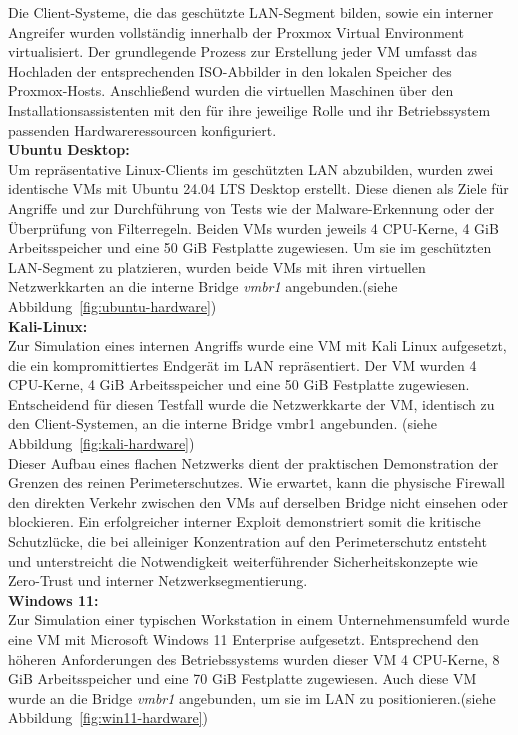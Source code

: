 Die Client-Systeme, die das geschützte LAN-Segment bilden, sowie ein interner Angreifer wurden vollständig innerhalb der Proxmox Virtual Environment virtualisiert. Der grundlegende Prozess zur Erstellung jeder VM umfasst das Hochladen der entsprechenden ISO-Abbilder in den lokalen Speicher des Proxmox-Hosts. Anschließend wurden die virtuellen Maschinen über den Installationsassistenten mit den für ihre jeweilige Rolle und ihr Betriebssystem passenden Hardwareressourcen konfiguriert.\\

\textbf{Ubuntu Desktop:}\\
Um repräsentative Linux-Clients im geschützten LAN abzubilden, wurden zwei identische VMs mit Ubuntu 24.04 LTS Desktop erstellt. Diese dienen als Ziele für Angriffe und zur Durchführung von Tests wie der Malware-Erkennung oder der Überprüfung von Filterregeln. Beiden VMs wurden jeweils 4 CPU-Kerne, 4 GiB Arbeitsspeicher und eine 50 GiB Festplatte zugewiesen. Um sie im geschützten LAN-Segment zu platzieren, wurden beide VMs mit ihren virtuellen Netzwerkkarten an die interne Bridge \textit{vmbr1} angebunden.(siehe Abbildung~\ref{fig:ubuntu-hardware})\\

\textbf{Kali-Linux:}\\
Zur Simulation eines internen Angriffs wurde eine VM mit Kali Linux aufgesetzt, die ein kompromittiertes Endgerät im LAN repräsentiert. Der VM wurden 4 CPU-Kerne, 4 GiB Arbeitsspeicher und eine 50 GiB Festplatte zugewiesen. Entscheidend für diesen Testfall wurde die Netzwerkkarte der VM, identisch zu den Client-Systemen, an die interne Bridge vmbr1 angebunden. (siehe Abbildung~\ref{fig:kali-hardware})\\
Dieser Aufbau eines flachen Netzwerks dient der praktischen Demonstration der Grenzen des reinen Perimeterschutzes. Wie erwartet, kann die physische Firewall den direkten Verkehr zwischen den VMs auf derselben Bridge nicht einsehen oder blockieren. Ein erfolgreicher interner Exploit demonstriert somit die kritische Schutzlücke, die bei alleiniger Konzentration auf den Perimeterschutz entsteht und unterstreicht die Notwendigkeit weiterführender Sicherheitskonzepte wie Zero-Trust und interner Netzwerksegmentierung.\\

\textbf{Windows 11:}\\
Zur Simulation einer typischen Workstation in einem Unternehmensumfeld wurde eine VM mit Microsoft Windows 11 Enterprise aufgesetzt. Entsprechend den höheren Anforderungen des Betriebssystems wurden dieser VM 4 CPU-Kerne, 8 GiB Arbeitsspeicher und eine 70 GiB Festplatte zugewiesen. Auch diese VM wurde an die Bridge \textit{vmbr1} angebunden, um sie im LAN zu positionieren.(siehe Abbildung~\ref{fig:win11-hardware})\\

